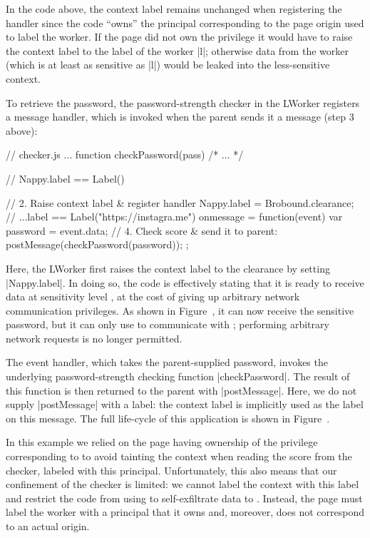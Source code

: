 In the  code above, the context label remains
unchanged when registering the handler since the code ``owns'' the
principal corresponding to the page origin used to label the worker.
%
If the page did not own the  privilege it would
have to raise the context label to the label of the worker \js|l|;
%
otherwise data from the worker (which is at least as sensitive as
\js|l|) would be leaked into the less-sensitive context.

To retrieve the password, the password-strength checker in the LWorker
registers a message handler, which is invoked when the parent
sends it a message (step 3 above):
\begin{jscode}
// checker.js ...
function checkPassword(pass) { /* ... */ }

// Nappy.label == Label()

// 2. Raise context label & register handler
Nappy.label = Brobound.clearance;
// ...label == Label("https://instagra.me")
onmessage = function(event) {
  var password = event.data;
  // 4. Check score & send it to parent:
  postMessage(checkPassword(password));
};
\end{jscode}
%
Here, the LWorker first raises the context label to the clearance by
setting \js|Nappy.label|.
%
In doing so, the code is effectively stating that it is ready to
receive data at sensitivity level , at the cost of
giving up arbitrary network communication privileges.
%
As shown in Figure~, it can now receive the
sensitive password, but it can only use \xhr{} to communicate with
;
%
performing arbitrary network requests is no longer permitted.

%
The event handler, which takes the parent-supplied password, invokes
the underlying password-strength checking function \js|checkPassword|.
%
The result of this function is then returned to the parent with
\js|postMessage|.
%
Here, we do not supply \js|postMessage| with a label: the context
label is implicitly used as the label on this message.
%
The full life-cycle of this application is shown in
Figure~.

%
In this example we relied on the page having ownership of the
privilege corresponding to  to avoid tainting the
context when reading the score from the checker, labeled with this
principal.
%
Unfortunately, this also means that our confinement of the checker is
limited: we cannot label the context with this label and restrict the
code from using \xhr{} to self-exfiltrate data to .
%
Instead, the page must label the worker with a principal that it owns
and, moreover, does not correspond to an actual origin.

